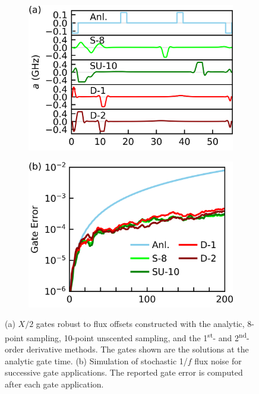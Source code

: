 \documentclass[
  amsfonts,
  amsmath,
  tbtags,
  amssymb,
  aps,
  nobibnotes,
  twocolumn,
  superscriptaddress,
]{revtex4-2}
\begin{document}
\begin{figure}[ht]
  \begin{subfigure}{.4\textwidth}
    \includegraphics[width=\linewidth]{assets/f3a.png}
  \end{subfigure}\hspace{0.025\textwidth}
  \begin{subfigure}{.4\textwidth}
    \includegraphics[width=\linewidth]{assets/f3b.png}
  \end{subfigure}

  \caption{
    (a) $X/2$ gates robust to flux offsets constructed with the analytic,
    8-point sampling, 10-point unscented sampling, and the 1\textsuperscript{st}-
    and 2\textsuperscript{nd}-order derivative methods. The gates shown
    are the solutions at the analytic gate time.
    (b) Simulation of stochastic 1/$f$ flux noise for
    successive gate applications. The reported gate error is computed
    after each gate application.
  }
\end{figure}
\end{document}

